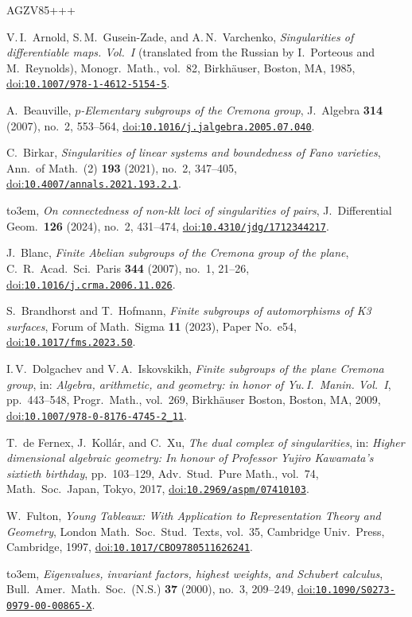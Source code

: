 \documentclass[10pt,a4paper]{article}
\newcommand{\doi}[1]{\href{https://doi.org/#1}{doi:\nolinkurl{#1}}}
\providecommand{\bysame}{\leavevmode\hbox to3em{\hrulefill}\thinspace}
\theoremstyle{definition}
\theoremstyle{remark}
\begin{document}
\begin{thebibliography}{AGZV85+++}

V.\,I.~Arnold, S.\,M.~Gusein-Zade, and A.\,N.~Varchenko,
{\em Singularities of differentiable maps. Vol.~I} (translated from the Russian by I.~Porteous and M.~Reynolds),
Monogr.\ Math., vol.~82, Birkh\"auser, Boston, MA, 1985,
\doi{10.1007/978-1-4612-5154-5}.

A.~Beauville, 
{\em $p$-Elementary subgroups of the Cremona group},
J.~Algebra \textbf{314} (2007), no.~2, 553--564,
\doi{10.1016/j.jalgebra.2005.07.040}.

C.~Birkar,
{\em Singularities of linear systems and boundedness of Fano varieties},
Ann.\ of Math.~(2) \textbf{193} (2021), no.~2, 347--405,
\doi{10.4007/annals.2021.193.2.1}.

\bysame, 
{\em On connectedness of non-klt loci of singularities of pairs}, 
J.~Differential Geom.\ \textbf{126} (2024), no.~2, 431--474,
\doi{10.4310/jdg/1712344217}.

J.~Blanc,
{\em Finite Abelian subgroups of the Cremona group of the plane},
C.\ R.\ Acad.\ Sci.\ Paris \textbf{344} (2007), no.~1, 21--26,
\doi{10.1016/j.crma.2006.11.026}.

S.~Brandhorst and T.~Hofmann, 
{\em Finite subgroups of automorphisms of K3 surfaces}, 
Forum of Math.\ Sigma \textbf{11} (2023), Paper No.~e54,
\doi{10.1017/fms.2023.50}.

I.\,V.~Dolgachev and V.\,A.~Iskovskikh, 
{\em Finite subgroups of the plane Cremona group},
in: {\em Algebra, arithmetic, and geometry: in honor of Yu.\,I.~Manin. 
Vol.~I}, pp.~443--548, Progr.\ Math., vol.~269, Birkh\"auser Boston,
Boston, MA, 2009,
\doi{10.1007/978-0-8176-4745-2_11}.

T.~de Fernex, J.~Koll\'ar, and C.~Xu,
{\em The dual complex of singularities},
in: {\em Higher dimensional algebraic geometry: In honour of Professor Yujiro Kawamata's sixtieth birthday}, pp.~103--129, Adv.\ Stud.\ Pure Math., vol.~74, Math.\ Soc.\ Japan, Tokyo, 2017,
\doi{10.2969/aspm/07410103}.

W.~Fulton, 
 {\em Young Tableaux: With Application to Representation Theory and Geometry}, 
 London Math.\ Soc.\ Stud.\ Texts, vol.~35, Cambridge Univ.\ Press, Cambridge, 1997, \doi{10.1017/CBO9780511626241}.

\bysame, 
 {\em Eigenvalues, invariant factors, highest weights, and Schubert calculus},
 Bull.\ Amer.\ Math.\ Soc.\ (N.S.) \textbf{37} (2000), no.~3, 209--249,
 \doi{10.1090/S0273-0979-00-00865-X}.


\end{thebibliography}
\end{document}
